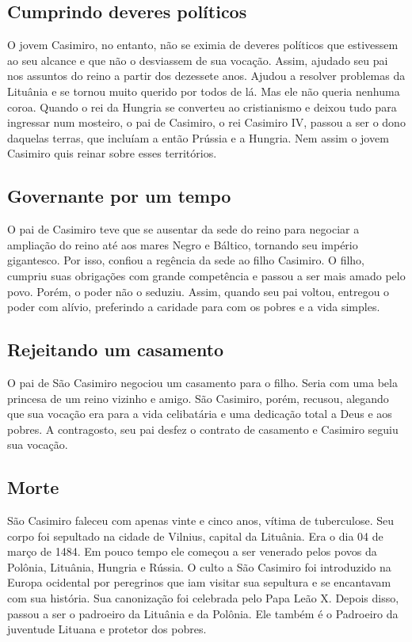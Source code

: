 \documentclass[a4paper,14pt]{extarticle} \usepackage[utf8]{inputenc}
\begin{document}
\subsection{Cumprindo deveres políticos}

O jovem Casimiro, no entanto, não se eximia de deveres políticos que estivessem ao seu alcance e que não o desviassem de sua vocação. Assim, ajudado seu pai nos assuntos do reino a partir dos dezessete anos. Ajudou a resolver problemas da Lituânia e se tornou muito querido por todos de lá. Mas ele não queria nenhuma coroa. Quando o rei da Hungria se converteu ao cristianismo e deixou tudo para ingressar num mosteiro, o pai de Casimiro, o rei Casimiro IV, passou a ser o dono daquelas terras, que incluíam a então Prússia e a Hungria. Nem assim o jovem Casimiro quis reinar sobre esses territórios.

\subsection{Governante por um tempo}

O pai de Casimiro teve que se ausentar da sede do reino para negociar a ampliação do reino até aos mares Negro e Báltico, tornando seu império gigantesco. Por isso, confiou a regência da sede ao filho Casimiro. O filho, cumpriu suas obrigações com grande competência e passou a ser mais amado pelo povo. Porém, o poder não o seduziu. Assim, quando seu pai voltou, entregou o poder com alívio, preferindo a caridade para com os pobres e a vida simples.

\subsection{Rejeitando um casamento}

O pai de São Casimiro negociou um casamento para o filho. Seria com uma bela princesa de um reino vizinho e amigo. São Casimiro, porém, recusou, alegando que sua vocação era para a vida celibatária e uma dedicação total a Deus e aos pobres. A contragosto, seu pai desfez o contrato de casamento e Casimiro seguiu sua vocação.

\subsection{Morte}

São Casimiro faleceu com apenas vinte e cinco anos, vítima de tuberculose. Seu corpo foi sepultado na cidade de Vilnius, capital da Lituânia. Era o dia 04 de março de 1484. Em pouco tempo ele começou a ser venerado pelos povos da Polônia, Lituânia, Hungria e Rússia. O culto a São Casimiro foi introduzido na Europa ocidental por peregrinos que iam visitar sua sepultura e se encantavam com sua história. Sua canonização foi celebrada pelo Papa Leão X. Depois disso, passou a ser o padroeiro da Lituânia e da Polônia. Ele também é o Padroeiro da juventude Lituana e protetor dos pobres.
\end{document}
